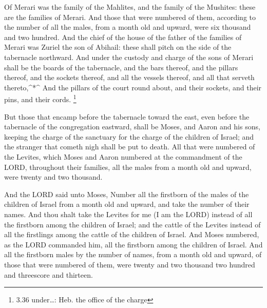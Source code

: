  Of Merari was the family of the Mahlites, and the family
of the Mushites: these are the families of Merari.  And
those that were numbered of them, according to the number of all the
males, from a month old and upward, were six thousand and two hundred.
 And the chief of the house of the father of the families
of Merari was Zuriel the son of Abihail: these shall pitch on the side
of the tabernacle northward.  And under the custody and
charge of the sons of Merari shall be the boards of the tabernacle, and
the bars thereof, and the pillars thereof, and the sockets thereof, and
all the vessels thereof, and all that serveth thereto,\^{}*\^{}
 And the pillars of the court round about, and their
sockets, and their pins, and their cords. \footnote{3.36 under\ldots:
  Heb. the office of the charge}

 But those that encamp before the tabernacle toward the
east, even before the tabernacle of the congregation eastward, shall be
Moses, and Aaron and his sons, keeping the charge of the sanctuary for
the charge of the children of Israel; and the stranger that cometh nigh
shall be put to death.  All that were numbered of the
Levites, which Moses and Aaron numbered at the commandment of the LORD,
throughout their families, all the males from a month old and upward,
were twenty and two thousand.

 And the LORD said unto Moses, Number all the firstborn of
the males of the children of Israel from a month old and upward, and
take the number of their names.  And thou shalt take the
Levites for me (I am the LORD) instead of all the firstborn among the
children of Israel; and the cattle of the Levites instead of all the
firstlings among the cattle of the children of Israel.  And
Moses numbered, as the LORD commanded him, all the firstborn among the
children of Israel.  And all the firstborn males by the
number of names, from a month old and upward, of those that were
numbered of them, were twenty and two thousand two hundred and
threescore and thirteen.


